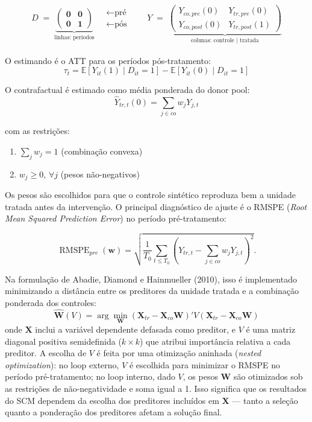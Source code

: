 \documentclass[
]{article}
\providecommand{\tightlist}{%
  \setlength{\itemsep}{0pt}\setlength{\parskip}{0pt}}
\begin{document}
\[
\begin{aligned}
D \;=\;
\underset{\text{linhas: períodos}}{\underbrace{
\begin{pmatrix}
\mathbf{0} & \mathbf{0}  \\
\mathbf{0} & \mathbf{1}
\end{pmatrix}
}}
\quad
\begin{matrix}
\leftarrow \text{pré} \\
\leftarrow \text{pós}
\end{matrix}
\qquad
Y \;=\;
\underset{\text{colunas: controle | tratada}}{\underbrace{
\begin{pmatrix}
Y_{co, pre}(0) & Y_{tr, pre}(0)  \\
Y_{co, post}(0)  & Y_{tr, post}(1)
\end{pmatrix}
}}
\end{aligned}
\]

O estimando é o ATT para os períodos pós-tratamento:
\[
\tau_t = \mathbb{E}[Y_{it}(1) \mid D_{it}=1] - \mathbb{E}[Y_{it}(0) \mid D_{it}=1]
\]

O contrafactual é estimado como média ponderada do donor pool:
\[
\hat{Y}_{tr, t}(0) = \sum_{j \in co} w_j Y_{j,t}
\]

com as restrições:

\begin{enumerate}
\def\labelenumi{\arabic{enumi}.}
\tightlist
\item
  \(\sum_j w_j = 1\) (combinação convexa)
\item
  \(w_j \geq 0\), \(\forall j\) (pesos não-negativos)
\end{enumerate}

Os pesos são escolhidos para que o controle sintético reproduza bem a unidade tratada antes da intervenção. O principal diagnóstico de ajuste é o RMSPE (\emph{Root Mean Squared Prediction Error}) no período pré-tratamento:

\[
\operatorname{RMSPE}_{pre}(\mathbf{w}) =
\sqrt{
\frac{1}{T_0}
\sum_{t \leq T_0}
\left(Y_{tr,t} - \sum_{j \in co} w_j Y_{j,t}\right)^2
}.
\]

Na formulação de Abadie, Diamond e Hainmueller (2010), isso é implementado minimizando a distância entre os preditores da unidade tratada e a combinação ponderada dos controles:
\[
\hat{\mathbf{W}}(V) = \arg\min_{\mathbf{W}} (\mathbf{X}_{tr} - \mathbf{X}_{co}\mathbf{W})' V (\mathbf{X}_{tr} - \mathbf{X}_{co}\mathbf{W})
\]
onde \(\mathbf{X}\) inclui a variável dependente defasada como preditor, e \(V\) é uma matriz diagonal positiva semidefinida (\(k \times k\)) que atribui importância relativa a cada preditor. A escolha de \(V\) é feita por uma otimização aninhada (\emph{nested optimization}): no loop externo, \(V\) é escolhida para minimizar o RMSPE no período pré-tratamento; no loop interno, dado \(V\), os pesos \(\mathbf{W}\) são otimizados sob as restrições de não-negatividade e soma igual a 1. Isso significa que os resultados do SCM dependem da escolha dos preditores incluídos em \(\mathbf{X}\) --- tanto a seleção quanto a ponderação dos preditores afetam a solução final.
\end{document}
